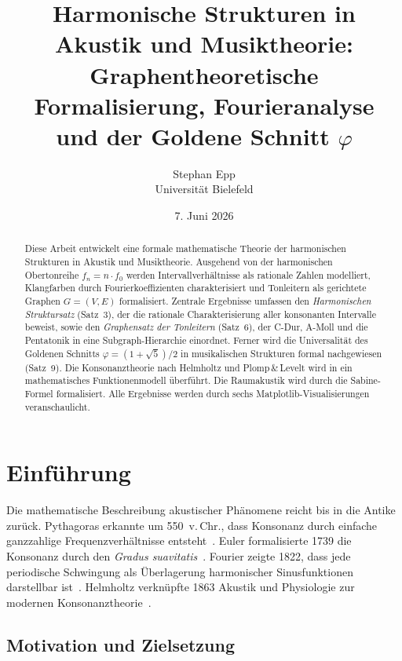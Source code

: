 ﻿\documentclass[a4paper,12pt]{article}
\title{Harmonische Strukturen in Akustik und Musiktheorie:\\
Graphentheoretische Formalisierung, Fourieranalyse\\
und der Goldene Schnitt $\varphi$}
\author{Stephan Epp\\
\small Universit\"at Bielefeld}
\date{7. Juni 2026}
\theoremstyle{definition}
\begin{document}
\maketitle

\begin{abstract}
Diese Arbeit entwickelt eine formale mathematische Theorie der harmonischen Strukturen
in Akustik und Musiktheorie. Ausgehend von der harmonischen Obertonreihe
$f_n = n \cdot f_0$ werden Intervallverhältnisse als rationale Zahlen modelliert,
Klangfarben durch Fourierkoeffizienten charakterisiert und Tonleitern als
gerichtete Graphen $G = (V, E)$ formalisiert. Zentrale Ergebnisse umfassen den
\emph{Harmonischen Struktursatz} (Satz~3), der die rationale Charakterisierung aller
konsonanten Intervalle beweist, sowie den \emph{Graphensatz der Tonleitern} (Satz~6),
der C-Dur, A-Moll und die Pentatonik in eine Subgraph-Hierarchie einordnet.
Ferner wird die Universalität des Goldenen Schnitts $\varphi = (1+\sqrt{5})/2$
in musikalischen Strukturen formal nachgewiesen (Satz~9). Die Konsonanztheorie
nach Helmholtz und Plomp\,\&\,Levelt wird in ein mathematisches Funktionenmodell
überführt. Die Raumakustik wird durch die Sabine-Formel formalisiert. Alle
Ergebnisse werden durch sechs Matplotlib-Visualisierungen veranschaulicht.
\end{abstract}

\tableofcontents
\newpage

\section{Einführung}

Die mathematische Beschreibung akustischer Phänomene reicht bis in die Antike zurück.
Pythagoras erkannte um 550~v.\,Chr., dass Konsonanz durch einfache ganzzahlige
Frequenzverhältnisse entsteht~\cite{pythagoras}. Euler formalisierte 1739 die Konsonanz
durch den \emph{Gradus suavitatis}~\cite{euler1739}. Fourier zeigte 1822, dass jede
periodische Schwingung als Überlagerung harmonischer Sinusfunktionen darstellbar
ist~\cite{fourier1822}. Helmholtz verknüpfte 1863 Akustik und Physiologie zur modernen
Konsonanztheorie~\cite{helmholtz1863}.

\subsection{Motivation und Zielsetzung}
\end{document}

